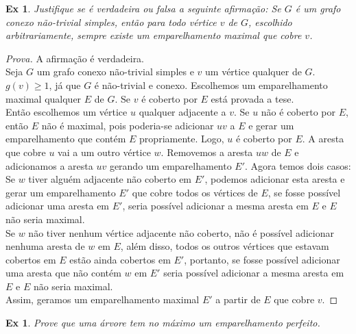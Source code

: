 \documentclass[12pt]{article}
\newcounter{exCounter}
\newtheorem{ex}[exCounter]{Ex}
\begin{document}
\begin{ex}
Justifique se é verdadeira ou falsa a seguinte afirmação: Se $G$ é um grafo conexo não-trivial simples, então para todo vértice $v$ de $G$, escolhido arbitrariamente, sempre existe um emparelhamento maximal que cobre $v$.
\end{ex}

\begin{proof}[Prova]
A afirmação é verdadeira. \\
Seja $G$ um grafo conexo não-trivial simples e $v$ um vértice qualquer de $G$. $g(v) \geq 1$, já que $G$ é não-trivial e conexo. Escolhemos um emparelhamento maximal qualquer $E$ de $G$. Se $v$ é coberto por $E$ está provada a tese.  \\
Então escolhemos um vértice $u$ qualquer adjacente a $v$. Se $u$ não é coberto por $E$, então $E$ não é maximal, pois poderia-se adicionar $uv$ a $E$ e gerar um emparelhamento que contém $E$ propriamente. Logo, $u$ é coberto por $E$. A aresta que cobre $u$ vai a um outro vértice $w$. Removemos a aresta $uw$ de $E$ e adicionamos a aresta $uv$ gerando um emparelhamento $E'$. Agora temos dois casos:
Se $w$ tiver alguém adjacente não coberto em $E'$, podemos adicionar esta aresta e gerar um emparelhamento $E'$ que cobre todos os vértices de $E$, se fosse possível adicionar uma aresta em $E'$, seria possível adicionar a mesma aresta em $E$ e $E$ não seria maximal. \\
Se $w$ não tiver nenhum vértice adjacente não coberto, não é possível adicionar nenhuma aresta de $w$ em $E$, além disso, todos os outros vértices que estavam cobertos em $E$ estão ainda cobertos em $E'$, portanto, se fosse possível adicionar uma aresta que não contém $w$ em $E'$ seria possível adicionar a mesma aresta em $E$ e $E$ não seria maximal. \\
Assim, geramos um emparelhamento maximal $E'$ a partir de $E$ que cobre $v$.
\end{proof}

\begin{ex}
Prove que uma árvore tem no máximo um emparelhamento perfeito.
\end{ex}
\end{document}
